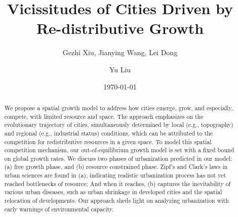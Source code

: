 \documentclass[reprint,unsortedaddress,amsmath,amssymb,aps,prl,showkeys]{revtex4-2}
\begin{document}
\title{Vicissitudes of Cities Driven by Re-distributive Growth}
\author{Gezhi Xiu, Jianying Wang, Lei Dong}
\author{Yu Liu}
\date{\today}

\begin{abstract}
    We propose a spatial growth model to address how cities emerge, grow, and especially, compete, with limited resource and space. The approach emphasizes on the evolutionary trajectory of cities, simultaneously determined by local (e.g., topography) and regional (e.g., industrial status) conditions, which can be attributed to the competition for redistributive resources in a given space. To model this spatial competition mechanism, our out-of-equilibrium growth model is set with a fixed bound on global growth rates. We discuss two phases of urbanization predicted in our model: (a) free growth phase, and (b) resource constrained phase. Zipf's and Clark's laws in urban sciences are found in (a), indicating realistic urbanization process has not yet reached bottlenecks of resource; And when it reaches, (b) captures the inevitability of various urban diseases, such as urban shrinkage in developed cities and the spatial relocation of developments. Our approach sheds light on analyzing urbanization with early warnings of environmental capacity.
\end{abstract}
\maketitle
\end{document}
